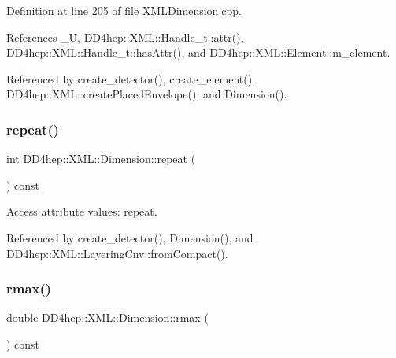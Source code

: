 Definition at line 205 of file X\+M\+L\+Dimension.\+cpp.



References \+\_\+U, D\+D4hep\+::\+X\+M\+L\+::\+Handle\+\_\+t\+::attr(), D\+D4hep\+::\+X\+M\+L\+::\+Handle\+\_\+t\+::has\+Attr(), and D\+D4hep\+::\+X\+M\+L\+::\+Element\+::m\+\_\+element.



Referenced by create\+\_\+detector(), create\+\_\+element(), D\+D4hep\+::\+X\+M\+L\+::create\+Placed\+Envelope(), and Dimension().

\hypertarget{struct_d_d4hep_1_1_x_m_l_1_1_dimension_ab612ed41a49b8bbddd85cebbebeaa79f}{}\label{struct_d_d4hep_1_1_x_m_l_1_1_dimension_ab612ed41a49b8bbddd85cebbebeaa79f} 
\subsubsection{\texorpdfstring{repeat()}{repeat()}}
{\footnotesize\ttfamily int D\+D4hep\+::\+X\+M\+L\+::\+Dimension\+::repeat (\begin{DoxyParamCaption}{ }\end{DoxyParamCaption}) const}



Access attribute values\+: repeat. 



Referenced by create\+\_\+detector(), Dimension(), and D\+D4hep\+::\+X\+M\+L\+::\+Layering\+Cnv\+::from\+Compact().

\hypertarget{struct_d_d4hep_1_1_x_m_l_1_1_dimension_a83b3db7828f1e58943eb0ddabc9e9459}{}\label{struct_d_d4hep_1_1_x_m_l_1_1_dimension_a83b3db7828f1e58943eb0ddabc9e9459} 
\subsubsection{\texorpdfstring{rmax()}{rmax()}\hspace{0.1cm}{\footnotesize\ttfamily [1/2]}}
{\footnotesize\ttfamily double D\+D4hep\+::\+X\+M\+L\+::\+Dimension\+::rmax (\begin{DoxyParamCaption}{ }\end{DoxyParamCaption}) const}



